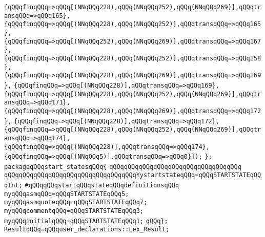 \verb|{qQQqfinqQQq=>qQQq[(NNqQQq228),qQQq(NNqQQq252),qQQq(NNqQQq269)],qQQqtransqQQq=>qQQq165},|\newline
\verb|{qQQqfinqQQq=>qQQq[(NNqQQq228),qQQq(NNqQQq252)],qQQqtransqQQq=>qQQq165},|\newline
\verb|{qQQqfinqQQq=>qQQq[(NNqQQq252),qQQq(NNqQQq269)],qQQqtransqQQq=>qQQq167},|\newline
\verb|{qQQqfinqQQq=>qQQq[(NNqQQq228),qQQq(NNqQQq252)],qQQqtransqQQq=>qQQq158},|\newline
\verb|{qQQqfinqQQq=>qQQq[(NNqQQq228),qQQq(NNqQQq269)],qQQqtransqQQq=>qQQq169},|\newline
\verb|{qQQqfinqQQq=>qQQq[(NNqQQq228)],qQQqtransqQQq=>qQQq169},|\newline
\verb|{qQQqfinqQQq=>qQQq[(NNqQQq228),qQQq(NNqQQq252),qQQq(NNqQQq269)],qQQqtransqQQq=>qQQq171},|\newline
\verb|{qQQqfinqQQq=>qQQq[(NNqQQq228),qQQq(NNqQQq269)],qQQqtransqQQq=>qQQq172},|\newline
\verb|{qQQqfinqQQq=>qQQq[(NNqQQq228)],qQQqtransqQQq=>qQQq172},|\newline
\verb|{qQQqfinqQQq=>qQQq[(NNqQQq228),qQQq(NNqQQq252),qQQq(NNqQQq269)],qQQqtransqQQq=>qQQq174},|\newline
\verb|{qQQqfinqQQq=>qQQq[(NNqQQq228)],qQQqtransqQQq=>qQQq174},|\newline
\verb|{qQQqfinqQQq=>qQQq[(NNqQQq5)],qQQqtransqQQq=>qQQq0}]);|\newline
\verb|};|\newline
\verb|packageqQQqstart_statesqQQq{|\newline
\verb|qQQqqQQqqQQqqQQqqQQqqQQqqQQqqQQqqQQq|\newline
\verb|qQQqqQQqqQQqqQQqqQQqqQQqqQQqqQQqqQQqYystartstateqQQq=qQQqSTARTSTATEqQQqInt;|\newline
\newline
\verb|#qQQqqQQqstartqQQqstateqQQqdefinitionsqQQq|\newline
\newline
\verb|myqQQqasmqQQq=qQQqSTARTSTATEqQQq5;|\newline
\verb|myqQQqasmquoteqQQq=qQQqSTARTSTATEqQQq7;|\newline
\verb|myqQQqcommentqQQq=qQQqSTARTSTATEqQQq3;|\newline
\verb|myqQQqinitialqQQq=qQQqSTARTSTATEqQQq1;|\newline
\newline
\verb|qQQq};|\newline
\verb|ResultqQQq=qQQquser_declarations::Lex_Result;|\newline
